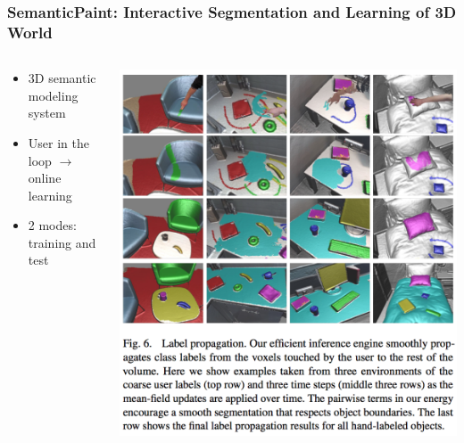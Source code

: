 {
  \frametitle{SemanticPaint: Interactive Segmentation and Learning of 3D World}

\begin{minipage}[0.2\textheight]{\textwidth}
	\begin{columns}[T]
		\begin{column}{0.5\textwidth}
			
			\begin{itemize}
				\item 3D semantic modeling system
				\item User in the loop $\rightarrow$ online learning
				\item 2 modes: training and test
			\end{itemize}
		\end{column}
		\begin{column}{0.4\textwidth}
			\includegraphics[width=\textwidth]{img/semanticpaint/labelpropagation.png}
		\end{column}
	\end{columns}
\end{minipage}
}

